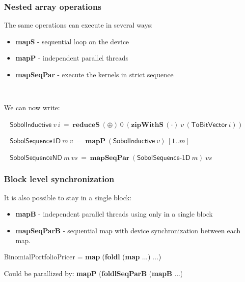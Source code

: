 \documentclass{beamer}
\begin{document}

\begin{frame}
  \frametitle{Nested array operations}

  The same operations can execute in several ways:

  \begin{itemize}
  \item \textbf{mapS} - sequential loop on the device
  \item \textbf{mapP} - independent parallel threads
  \item \textbf{mapSeqPar} - execute the kernels in strict sequence
  \end{itemize}
  ~\vspace{2mm}\pause

  We can now write:

  ~\vspace{2mm}
  $\mathsf{SobolInductive}~v~i~=~\textbf{reduceS}~(\oplus)~0~(\textbf{zipWithS}~(\cdot)~v~(\textsf{ToBitVector}~i))$
  
  ~\vspace{2mm}\pause
  $\mathsf{SobolSequence1D}~m~v~=~\textbf{mapP}~(\textsf{SobolInductive}~v)~[1..m]$
  
  ~\vspace{2mm}\pause
  $\mathsf{SobolSequenceND}~m~vs~=~\textbf{mapSeqPar}~(\textsf{SobolSequence-1D}~m)~vs$

\end{frame}



\begin{frame}
  \frametitle{Block level synchronization}

  It is also possible to stay in a single block:

  \begin{itemize}
  \item \textbf{mapB} - independent parallel threads using only in a single block
  \item \textbf{mapSeqParB} - sequential map with device synchronization between each map.
  \end{itemize}


  BinomialPortfolioPricer = \textbf{map} (\textbf{foldl} (\textbf{map} ...) ...)

  Could be parallized by: \textbf{mapP} (\textbf{foldlSeqParB} (\textbf{mapB} ...)
\end{frame}
\end{document}
